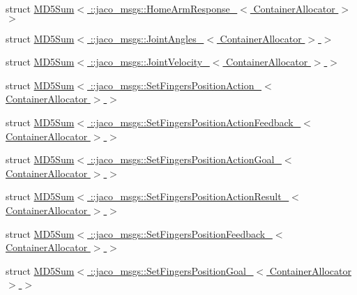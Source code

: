 \begin{DoxyCompactItemize}
\item 
struct \hyperlink{structros_1_1message__traits_1_1MD5Sum_3_01_1_1jaco__msgs_1_1HomeArmResponse___3_01ContainerAllocator_01_4_01_4}{M\+D5\+Sum$<$ \+::jaco\+\_\+msgs\+::\+Home\+Arm\+Response\+\_\+$<$ Container\+Allocator $>$ $>$}
\item 
struct \hyperlink{structros_1_1message__traits_1_1MD5Sum_3_01_1_1jaco__msgs_1_1JointAngles___3_01ContainerAllocator_01_4_01_4}{M\+D5\+Sum$<$ \+::jaco\+\_\+msgs\+::\+Joint\+Angles\+\_\+$<$ Container\+Allocator $>$ $>$}
\item 
struct \hyperlink{structros_1_1message__traits_1_1MD5Sum_3_01_1_1jaco__msgs_1_1JointVelocity___3_01ContainerAllocator_01_4_01_4}{M\+D5\+Sum$<$ \+::jaco\+\_\+msgs\+::\+Joint\+Velocity\+\_\+$<$ Container\+Allocator $>$ $>$}
\item 
struct \hyperlink{structros_1_1message__traits_1_1MD5Sum_3_01_1_1jaco__msgs_1_1SetFingersPositionAction___3_01ContainerAllocator_01_4_01_4}{M\+D5\+Sum$<$ \+::jaco\+\_\+msgs\+::\+Set\+Fingers\+Position\+Action\+\_\+$<$ Container\+Allocator $>$ $>$}
\item 
struct \hyperlink{structros_1_1message__traits_1_1MD5Sum_3_01_1_1jaco__msgs_1_1SetFingersPositionActionFeedback___dfd49ff210ac61d84c4dc5e7681b49fc}{M\+D5\+Sum$<$ \+::jaco\+\_\+msgs\+::\+Set\+Fingers\+Position\+Action\+Feedback\+\_\+$<$ Container\+Allocator $>$ $>$}
\item 
struct \hyperlink{structros_1_1message__traits_1_1MD5Sum_3_01_1_1jaco__msgs_1_1SetFingersPositionActionGoal___3_01ContainerAllocator_01_4_01_4}{M\+D5\+Sum$<$ \+::jaco\+\_\+msgs\+::\+Set\+Fingers\+Position\+Action\+Goal\+\_\+$<$ Container\+Allocator $>$ $>$}
\item 
struct \hyperlink{structros_1_1message__traits_1_1MD5Sum_3_01_1_1jaco__msgs_1_1SetFingersPositionActionResult___3_01ContainerAllocator_01_4_01_4}{M\+D5\+Sum$<$ \+::jaco\+\_\+msgs\+::\+Set\+Fingers\+Position\+Action\+Result\+\_\+$<$ Container\+Allocator $>$ $>$}
\item 
struct \hyperlink{structros_1_1message__traits_1_1MD5Sum_3_01_1_1jaco__msgs_1_1SetFingersPositionFeedback___3_01ContainerAllocator_01_4_01_4}{M\+D5\+Sum$<$ \+::jaco\+\_\+msgs\+::\+Set\+Fingers\+Position\+Feedback\+\_\+$<$ Container\+Allocator $>$ $>$}
\item 
struct \hyperlink{structros_1_1message__traits_1_1MD5Sum_3_01_1_1jaco__msgs_1_1SetFingersPositionGoal___3_01ContainerAllocator_01_4_01_4}{M\+D5\+Sum$<$ \+::jaco\+\_\+msgs\+::\+Set\+Fingers\+Position\+Goal\+\_\+$<$ Container\+Allocator $>$ $>$}

\end{DoxyCompactItemize}
